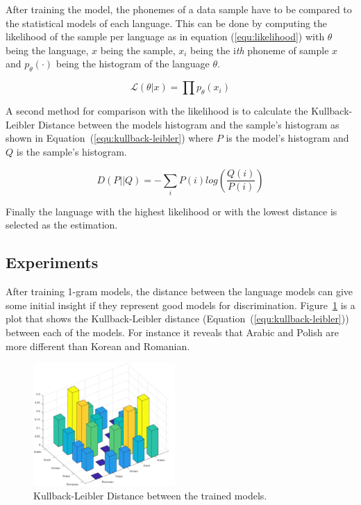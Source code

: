 \documentclass{article}
\begin{document}
After training the model, the phonemes of a data sample have to be compared to the statistical models of each language. This can be done by computing the likelihood of the sample per language \cite{matejka2005phonotactic} as in equation (\ref{equ:likelihood}) with $\theta$ being the language, $x$ being the sample, $x_i$ being the i\textit{th} phoneme of sample $x$ and $p_{\theta}(\cdot)$ being the histogram of the language $\theta$.

\begin{equation}
\label{equ:likelihood}
    \mathcal{L}(\theta | x) = \prod p_{\theta} (x_i)
\end{equation}

A second method for comparison with the likelihood is to calculate the Kullback-Leibler Distance between the models histogram and the sample's histogram as shown in Equation~(\ref{equ:kullback-leibler}) where $P$ is the model's histogram and $Q$ is the sample's histogram.

\begin{equation}
\label{equ:kullback-leibler}
    D(P || Q) = - \sum_{i} P(i) log\left(\frac{Q(i)}{P(i)}\right)
\end{equation}

Finally the language with the highest likelihood or with the lowest distance is selected as the estimation.

\subsection{Experiments}

After training 1-gram models, the distance between the language models can give some initial insight if they represent good models for discrimination. Figure~\ref{fig:distance_between_languages} is a plot that shows the Kullback-Leibler distance (Equation~(\ref{equ:kullback-leibler})) between each of the models. For instance it reveals that Arabic and Polish are more different than Korean and Romanian.

\begin{figure}[h]
    \centering
    \includegraphics[width=0.48\textwidth]{img/kullback-leibler_5languages.pdf}
    \caption{Kullback-Leibler Distance between the trained models.}
    \label{fig:distance_between_languages}
\end{figure}
\end{document}
